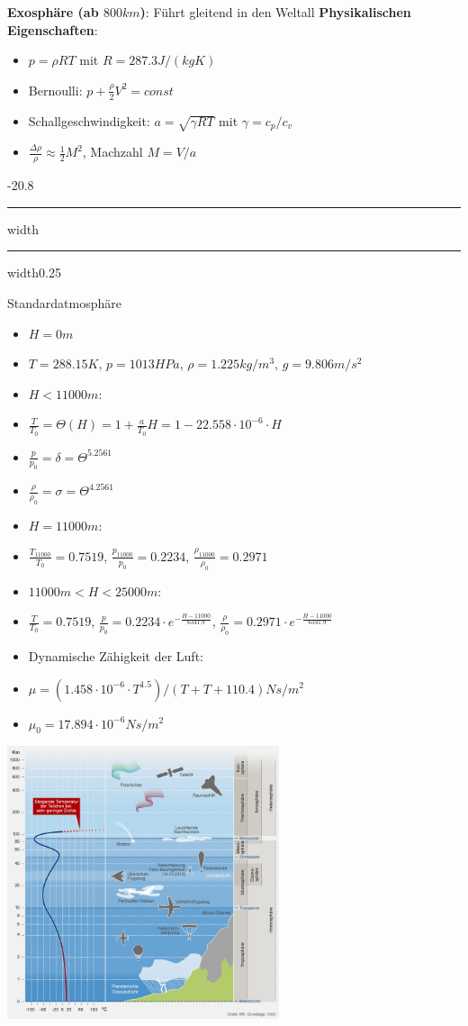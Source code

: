 \documentclass[8pt, landscape, fleqn]{scrartcl}
\makeatletter
\renewcommand{\subsection}{\@startsection{subsection}{1}{0mm}%
{-2\baselineskip}{0.8\baselineskip}%
{\hrule depth 0.2pt width\columnwidth\hrule depth0.75pt
width0.25\columnwidth\vspace*{1.2em}\large\bfseries\rmfamily}}
\makeatother
\begin{document}
\begin{multicols*}{3}
\textbf{Exosphäre (ab $800 km$)}: Führt gleitend in den Weltall
\newline \newline
\textbf{Physikalischen Eigenschaften}:
\begin{itemize}
\item $p = \rho R T$ mit $R = 287.3 J/(kg K)$ 
\item Bernoulli: $p + \frac{\rho}{2}V^2 = const$
\item Schallgeschwindigkeit: $a = \sqrt{\gamma R T}$ mit $\gamma = c_p / c_v$
\item $\frac{\Delta \rho}{\rho} \approx \frac{1}{2} M^2$, Machzahl $M = V/a$
\end{itemize}

\subsection{Standardatmosphäre}
\begin{itemize}
    \item $H = 0m$
    \item $T = 288.15 K$, $p = 1013 HPa$, $\rho = 1.225 kg/m^3$, $g = 9.806 m/s^2$
    \item $H < 11000 m$:
    \item $\frac{T}{T_0} = \Theta(H)= 1 + \frac{a}{T_0} H = 1-22.558\cdot 10^{-6} \cdot H$
    \item $\frac{p}{p_0} = \delta = \Theta^{5.2561}$
    \item $\frac{\rho}{\rho_0} = \sigma = \Theta^{4.2561}$
    \item $H = 11000 m$:
    \item $\frac{T_{11000}}{T_0} = 0.7519$, $\frac{p_{11000}}{p_0} = 0.2234$, $\frac{\rho_{11000}}{\rho_0} = 0.2971$
    \item $11000 m < H < 25000m$: 
    \item $\frac{T}{T_0}= 0.7519$, $\frac{p}{p_0} = 0.2234 \cdot e^{-\frac{H-11000}{6341.9}}$, $\frac{\rho}{\rho_0} = 0.2971 \cdot e^{-\frac{H-11000}{6341.9}}$
    \item Dynamische Zähigkeit der Luft:
    \item $\mu = (1.458\cdot 10^{-6}\cdot T^{1.5})/(T+T+110.4) Ns/m^2$
    \item $\mu_0 = 17.894 \cdot 10^{-6} Ns/m^2$
\end{itemize}

\includegraphics[width=8cm]{meteorologie-wetter-atmosphaere-102}


\end{multicols*}
\end{document}
